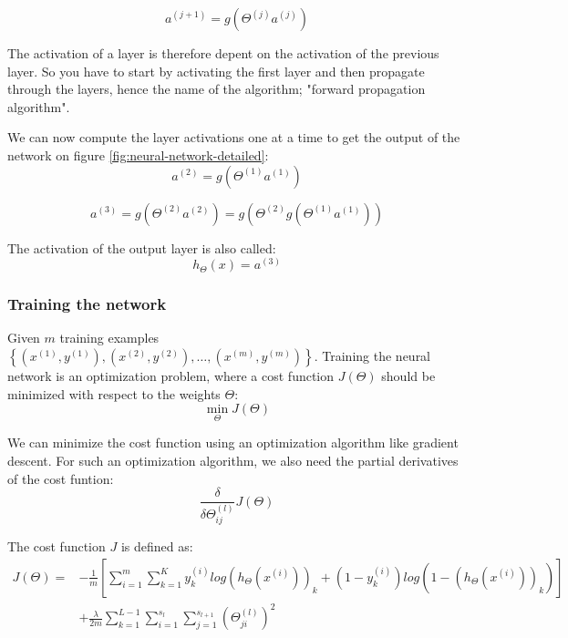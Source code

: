 \begin{equation}
a^{(j+1)} = g(\Theta^{(j)}a^{(j)})
\end{equation}

The activation of a layer is therefore depent on the activation of the previous layer. So you have to start by activating the first layer and then propagate through the layers, hence the name of the algorithm; "forward propagation algorithm".

We can now compute the layer activations one at a time to get the output of the network on figure \ref{fig:neural-network-detailed}:
\begin{equation}
a^{(2)} = g(\Theta^{(1)}a^{(1)})
\end{equation}

\begin{equation}
a^{(3)} = g(\Theta^{(2)}a^{(2)}) = g(\Theta^{(2)} g(\Theta^{(1)}a^{(1)}))
\end{equation}

The activation of the output layer is also called:
\begin{equation}
h_\Theta(x) = a^{(3)}
\end{equation}

\subsubsection{Training the network}
Given $m$ training examples $\left\{(x^{(1)},y^{(1)}), (x^{(2)},y^{(2)}),\dots, (x^{(m)},y^{(m)}) \right\}$.
Training the neural network is an optimization problem, where a cost function $J(\Theta)$ should be minimized with respect to the weights $\Theta$:
\begin{equation}
\min_{\Theta} J(\Theta)
\end{equation}

We can minimize the cost function using an optimization algorithm like gradient descent. For such an optimization algorithm, we also need the partial derivatives of the cost funtion:
\begin{equation}
\frac{\delta}{\delta\Theta^{(l)}_{ij}}J(\Theta)
\end{equation}

The cost function $J$ is defined as:
\begin{equation}
\begin{split}
J(\Theta) = &-\frac{1}{m}
\left[
\sum^m_{i=1}\sum^K_{k=1}
y_k^{(i)}
log(h_\Theta(x^{(i)}))_k +
(1-y_k^{(i)})
log(1-(h_\Theta(x^{(i)}))_k)
\right] \\
&+ \frac{\lambda}{2m}
\sum^{L-1}_{k=1}
\sum^{s_l}_{i=1}
\sum^{s_{l+1}}_{j=1}
(\Theta^{(l)}_{ji})^2
\end{split}
\end{equation}


